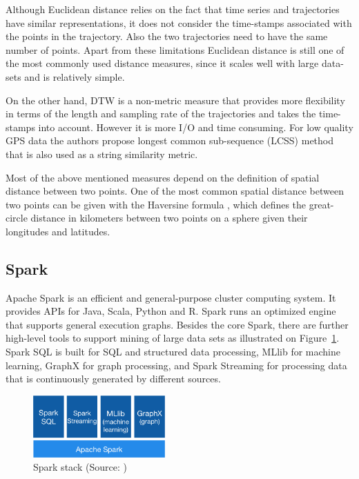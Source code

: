 Although Euclidean distance relies on the fact that time series and trajectories have similar representations, it does not consider the time-stamps associated with the points in the trajectory. Also the two trajectories need to have the same number of points. Apart from these limitations Euclidean distance is still one of the most commonly used distance measures, since it scales well with large data-sets and is relatively simple. 

On the other hand, DTW is a non-metric measure that provides more flexibility in terms of the length and sampling rate of the trajectories and takes the time-stamps into account. However it is more I/O and time consuming. For low quality GPS data the authors propose longest common sub-sequence (LCSS) method that is also used as a string similarity metric.

Most of the above mentioned measures depend on the definition of spatial distance between two points. One of the most common spatial distance between two points can be given with the Haversine formula \cite{haversine}, which  defines the great-circle distance in kilometers between two points on a sphere given their longitudes and latitudes.

\subsection{Spark}
Apache Spark is an efficient and general-purpose cluster computing system. It provides APIs for Java, Scala, Python and R. Spark runs an optimized engine that supports general execution graphs. Besides the core Spark, there are further high-level tools to support mining of large data sets as illustrated on Figure~\ref{fig:spark}. Spark SQL is built for SQL and structured data processing, MLlib for machine learning, GraphX for graph processing, and Spark Streaming for processing data that is continuously generated by different sources.
\begin{figure}[h]
    \centering
    \includegraphics[width=0.45\textwidth]{images/spark-stack}
    \caption{Spark stack (Source: \cite{spark})}
    \label{fig:spark}
\end{figure}

